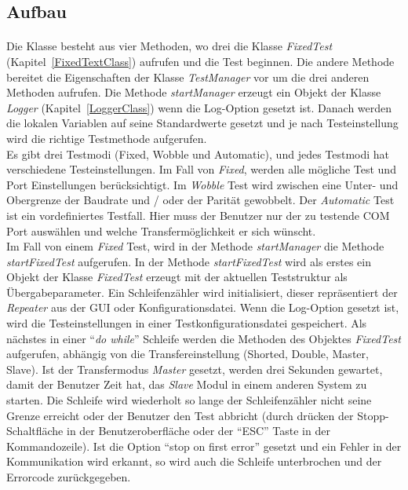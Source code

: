 \subsection{Aufbau}
\paragraph{}

Die Klasse besteht aus vier Methoden, wo drei die Klasse \textit{FixedTest} (Kapitel~\ref{FixedTextClass}) aufrufen und die Test beginnen. Die andere Methode bereitet die Eigenschaften der Klasse \textit{TestManager} vor um die drei anderen Methoden aufrufen. Die Methode \textit{startManager} erzeugt ein Objekt der Klasse \textit{Logger} (Kapitel~\ref{LoggerClass}) wenn die Log-Option gesetzt ist. Danach werden die lokalen Variablen auf seine Standardwerte gesetzt und je nach Testeinstellung wird die richtige Testmethode aufgerufen.\\

Es gibt drei Testmodi (Fixed, Wobble und Automatic), und jedes Testmodi hat verschiedene Testeinstellungen. Im Fall von \textit{Fixed}, werden alle mögliche Test und Port Einstellungen berücksichtigt. Im \textit{Wobble} Test wird zwischen eine Unter- und Obergrenze der Baudrate und / oder der Parität gewobbelt. Der \textit{Automatic} Test ist ein vordefiniertes Testfall. Hier muss der Benutzer nur der zu testende COM Port auswählen und welche Transfermöglichkeit er sich wünscht.\\

Im Fall von einem \textit{Fixed} Test, wird in der Methode \textit{startManager} die Methode \textit{startFixedTest} aufgerufen. In der Methode \textit{startFixedTest} wird als erstes ein Objekt der Klasse \textit{FixedTest} erzeugt mit der aktuellen Teststruktur als Übergabeparameter. Ein Schleifenzähler wird initialisiert, dieser repräsentiert der \textit{Repeater} aus der GUI oder Konfigurationsdatei. Wenn die Log-Option gesetzt ist, wird die Testeinstellungen in einer Testkonfigurationsdatei gespeichert. Als nächstes in einer "`\textit{do while}"' Schleife werden die Methoden des Objektes \textit{FixedTest} aufgerufen, abhängig von die  Transfereinstellung (Shorted, Double, Master, Slave). Ist der Transfermodus \textit{Master} gesetzt, werden drei Sekunden gewartet, damit der Benutzer Zeit hat, das \textit{Slave} Modul in einem anderen System zu starten. Die Schleife wird wiederholt so lange der Schleifenzähler nicht seine Grenze erreicht oder der Benutzer den Test abbricht (durch drücken der Stopp-Schaltfläche in der Benutzeroberfläche oder der "`ESC"' Taste in der Kommandozeile). Ist die Option "`stop on first error"' gesetzt und ein Fehler in der Kommunikation wird erkannt, so wird auch die Schleife unterbrochen und der Errorcode zurückgegeben.\\

